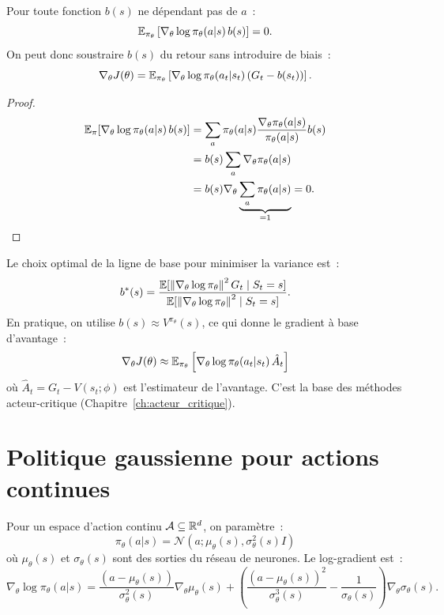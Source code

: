 \begin{theoreme}
\label{thm:baseline}
Pour toute fonction $b(s)$ ne d\'ependant pas de $a$~:
\[
    \mathbb{E}_{\pi_\theta}\left[\nabla_\theta \log \pi_\theta(a|s) \, b(s)\right] = 0.
\]
On peut donc soustraire $b(s)$ du retour sans introduire de biais~:
\[
    \nabla_\theta J(\theta) = \mathbb{E}_{\pi_\theta}\left[
    \nabla_\theta \log \pi_\theta(a_t|s_t) \, (G_t - b(s_t))
    \right].
\]
\end{theoreme}

\begin{proof}
\begin{align*}
    \mathbb{E}_\pi[\nabla_\theta \log \pi_\theta(a|s) \, b(s)]
    &= \sum_a \pi_\theta(a|s) \frac{\nabla_\theta \pi_\theta(a|s)}{\pi_\theta(a|s)} b(s) \\
    &= b(s) \sum_a \nabla_\theta \pi_\theta(a|s) \\
    &= b(s) \nabla_\theta \underbrace{\sum_a \pi_\theta(a|s)}_{=1} = 0. \qedhere
\end{align*}
\end{proof}

\begin{remarque}
Le choix optimal de la ligne de base pour minimiser la variance est~:
\[
    b^*(s) = \frac{\mathbb{E}[\left\| \nabla_\theta \log \pi_\theta \right\|^2 G_t \mid S_t = s]}
    {\mathbb{E}[\left\| \nabla_\theta \log \pi_\theta \right\|^2 \mid S_t = s]}.
\]
En pratique, on utilise $b(s) \approx V^{\pi_\theta}(s)$, ce qui donne le
gradient \`a base d'avantage~:
\[
    \nabla_\theta J(\theta) \approx \mathbb{E}_{\pi_\theta}\left[
    \nabla_\theta \log \pi_\theta(a_t|s_t) \, \hat{A}_t
    \right]
\]
o\`u $\hat{A}_t = G_t - V(s_t; \phi)$ est l'estimateur de l'avantage.
C'est la base des m\'ethodes acteur-critique (Chapitre~\ref{ch:acteur_critique}).
\end{remarque}

\section{Politique gaussienne pour actions continues}

\begin{definition}
Pour un espace d'action continu $\mathcal{A} \subseteq \mathbb{R}^d$, on param\`etre~:
\[
    \pi_\theta(a | s) = \mathcal{N}\!\left(a; \mu_\theta(s), \sigma_\theta^2(s) I\right)
\]
o\`u $\mu_\theta(s)$ et $\sigma_\theta(s)$ sont des sorties du r\'eseau de neurones.
Le log-gradient est~:
\[
    \nabla_\theta \log \pi_\theta(a|s) =
    \frac{(a - \mu_\theta(s))}{\sigma_\theta^2(s)} \nabla_\theta \mu_\theta(s)
    + \left(\frac{(a - \mu_\theta(s))^2}{\sigma_\theta^3(s)} - \frac{1}{\sigma_\theta(s)}\right) \nabla_\theta \sigma_\theta(s).
\]
\end{definition}

